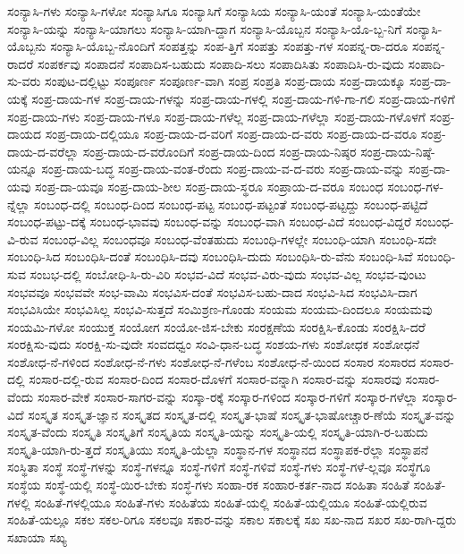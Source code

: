 {ಸಂನ್ಯಾಸಿ-ಗಳು
ಸಂನ್ಯಾಸಿ-ಗಳೋ
ಸಂನ್ಯಾಸಿಗೂ
ಸಂನ್ಯಾಸಿಗೆ
ಸಂನ್ಯಾಸಿಯ
ಸಂನ್ಯಾಸಿ-ಯಂತೆ
ಸಂನ್ಯಾಸಿ-ಯಂತೆಯೇ
ಸಂನ್ಯಾಸಿ-ಯನ್ನು
ಸಂನ್ಯಾಸಿ-ಯಾಗಲು
ಸಂನ್ಯಾಸಿ-ಯಾಗಿ-ದ್ದಾಗ
ಸಂನ್ಯಾಸಿ-ಯೊಬ್ಬನ
ಸಂನ್ಯಾಸಿ-ಯೊ-ಬ್ಬ-ನಿಗೆ
ಸಂನ್ಯಾಸಿ-ಯೊಬ್ಬನು
ಸಂನ್ಯಾಸಿ-ಯೊಬ್ಬ-ನೊಂದಿಗೆ
ಸಂಪತ್ತನ್ನು
ಸಂಪ-ತ್ತಿಗೆ
ಸಂಪತ್ತು
ಸಂಪತ್ತು-ಗಳ
ಸಂಪನ್ನ-ರಾ-ದರೂ
ಸಂಪನ್ನ-ರಾದರೆ
ಸಂಪರ್ಕವು
ಸಂಪಾದನೆ
ಸಂಪಾದಿಸ-ಬಹುದು
ಸಂಪಾದಿ-ಸಲು
ಸಂಪಾದಿಸಿತು
ಸಂಪಾದಿಸಿ-ರು-ವುದು
ಸಂಪಾದಿ-ಸು-ವರು
ಸಂಪುಟ-ದಲ್ಲಿಟ್ಟು
ಸಂಪೂರ್ಣ
ಸಂಪೂರ್ಣ-ವಾಗಿ
ಸಂಪ್ರ
ಸಂಪ್ರತಿ
ಸಂಪ್ರ-ದಾಯ
ಸಂಪ್ರ-ದಾಯಕ್ಕೂ
ಸಂಪ್ರ-ದಾ-ಯಕ್ಕೆ
ಸಂಪ್ರ-ದಾಯ-ಗಳ
ಸಂಪ್ರ-ದಾಯ-ಗಳನ್ನು
ಸಂಪ್ರ-ದಾಯ-ಗಳಲ್ಲಿ
ಸಂಪ್ರ-ದಾಯ-ಗಳಿ-ಗಾ-ಗಲಿ
ಸಂಪ್ರ-ದಾಯ-ಗಳಿಗೆ
ಸಂಪ್ರ-ದಾಯ-ಗಳು
ಸಂಪ್ರ-ದಾಯ-ಗಳೂ
ಸಂಪ್ರ-ದಾಯ-ಗಳೆಲ್ಲ
ಸಂಪ್ರ-ದಾಯ-ಗಳೆಲ್ಲಾ
ಸಂಪ್ರ-ದಾಯ-ಗಳೊಳಗೆ
ಸಂಪ್ರ-ದಾಯದ
ಸಂಪ್ರ-ದಾಯ-ದಲ್ಲಿಯೂ
ಸಂಪ್ರ-ದಾಯ-ದ-ವರಿಗೆ
ಸಂಪ್ರ-ದಾಯ-ದ-ವರು
ಸಂಪ್ರ-ದಾಯ-ದ-ವರೂ
ಸಂಪ್ರ-ದಾಯ-ದ-ವರೆಲ್ಲಾ
ಸಂಪ್ರ-ದಾಯ-ದ-ವರೊಂದಿಗೆ
ಸಂಪ್ರ-ದಾಯ-ದಿಂದ
ಸಂಪ್ರ-ದಾಯ-ನಿಷ್ಠರ
ಸಂಪ್ರ-ದಾಯ-ನಿಷ್ಠೆ-ಯನ್ನೂ
ಸಂಪ್ರ-ದಾಯ-ಬದ್ಧ
ಸಂಪ್ರ-ದಾಯ-ವಂತ-ರೆಂದು
ಸಂಪ್ರ-ದಾಯ-ವ-ದ-ವರು
ಸಂಪ್ರ-ದಾಯ-ವನ್ನು
ಸಂಪ್ರ-ದಾ-ಯವು
ಸಂಪ್ರ-ದಾ-ಯವೂ
ಸಂಪ್ರ-ದಾಯ-ಶೀಲ
ಸಂಪ್ರ-ದಾಯ-ಸ್ಥರೂ
ಸಂಪ್ರಾಯ-ದ-ವರೂ
ಸಂಬಂಧ
ಸಂಬಂಧ-ಗಳ-ನ್ನೆಲ್ಲಾ
ಸಂಬಂಧ-ದಲ್ಲಿ
ಸಂಬಂಧ-ದಿಂದ
ಸಂಬಂಧ-ಪಟ್ಟ
ಸಂಬಂಧ-ಪಟ್ಟಂತೆ
ಸಂಬಂಧ-ಪಟ್ಟದ್ದು
ಸಂಬಂಧ-ಪಟ್ಟಿದೆ
ಸಂಬಂಧ-ಪಟ್ಟು-ದಕ್ಕೆ
ಸಂಬಂಧ-ಭಾವವು
ಸಂಬಂಧ-ವನ್ನು
ಸಂಬಂಧ-ವಾಗಿ
ಸಂಬಂಧ-ವಿದೆ
ಸಂಬಂಧ-ವಿದ್ದರೆ
ಸಂಬಂಧ-ವಿ-ರುವ
ಸಂಬಂಧ-ವಿಲ್ಲ
ಸಂಬಂಧವೂ
ಸಂಬಂಧ-ವೆಂತಹುದು
ಸಂಬಂಧಿ-ಗಳಲ್ಲೇ
ಸಂಬಂಧಿ-ಯಾಗಿ
ಸಂಬಂಧಿ-ಸದೇ
ಸಂಬಂಧಿ-ಸಿದ
ಸಂಬಂಧಿಸಿ-ದಂತೆ
ಸಂಬಂಧಿಸಿ-ದವು
ಸಂಬಂಧಿಸಿ-ದುದು
ಸಂಬಂಧಿಸಿ-ರು-ವೆನು
ಸಂಬಂಧಿ-ಸಿವೆ
ಸಂಬಂಧಿ-ಸುವ
ಸಂಬಭ-ದಲ್ಲಿ
ಸಂಬೋಧಿ-ಸಿ-ರು-ವಿರಿ
ಸಂಭವ-ವಿದೆ
ಸಂಭವ-ವಿರು-ವುದು
ಸಂಭವ-ವಿಲ್ಲ
ಸಂಭವ-ವುಂಟು
ಸಂಭವವೂ
ಸಂಭವವೇ
ಸಂಭ-ವಾಮಿ
ಸಂಭವಿಸ-ದಂತೆ
ಸಂಭವಿಸ-ಬಹು-ದಾದ
ಸಂಭವಿ-ಸಿದ
ಸಂಭವಿಸಿ-ದಾಗ
ಸಂಭವಿಸಿಯೇ
ಸಂಭವಿಸಿಲ್ಲ
ಸಂಭವಿ-ಸುತ್ತದೆ
ಸಂಮಿಶ್ರಣ-ಗೊಂಡು
ಸಂಯಮ
ಸಂಯಮ-ದಿಂದಲೂ
ಸಂಯಮವು
ಸಂಯಮಿ-ಗಳೋ
ಸಂಯುಕ್ತ
ಸಂಯೋಗ
ಸಂಯೋ-ಜಿಸ-ಬೇಕು
ಸಂರಕ್ಷಣೆಯ
ಸಂರಕ್ಷಿಸಿ-ಕೊಂಡು
ಸಂರಕ್ಷಿಸಿ-ದರೆ
ಸಂರಕ್ಷಿಸು-ವುದು
ಸಂರಕ್ಷಿ-ಸು-ವುದೇ
ಸಂವದಧ್ವಂ
ಸಂವಿ-ಧಾನ-ಬದ್ಧ
ಸಂಶಯ-ಗಳು
ಸಂಶೋಧಕ
ಸಂಶೋಧನೆ
ಸಂಶೋಧ-ನೆ-ಗಳಿಂದ
ಸಂಶೋಧ-ನೆ-ಗಳು
ಸಂಶೋಧ-ನೆ-ಗಳೆಂಬ
ಸಂಶೋಧ-ನೆ-ಯಿಂದ
ಸಂಸಾರ
ಸಂಸಾರದ
ಸಂಸಾರ-ದಲ್ಲಿ
ಸಂಸಾರ-ದಲ್ಲಿ-ರುವ
ಸಂಸಾರ-ದಿಂದ
ಸಂಸಾರ-ದೊಳಗೆ
ಸಂಸಾರ-ವನ್ನಾಗಿ
ಸಂಸಾರ-ವನ್ನು
ಸಂಸಾರವು
ಸಂಸಾರ-ವೆಂದು
ಸಂಸಾರ-ವೇಕೆ
ಸಂಸಾರ-ಸಾಗರ-ವನ್ನು
ಸಂಸ್ಕಾ-ರಕ್ಕೆ
ಸಂಸ್ಕಾರ-ಗಳಿಂದ
ಸಂಸ್ಕಾರ-ಗಳಿಗೆ
ಸಂಸ್ಕಾರ-ಗಳೆಲ್ಲಾ
ಸಂಸ್ಕಾರ-ವಿದೆ
ಸಂಸ್ಕೃತ
ಸಂಸ್ಕೃತ-ಜ್ಞಾನ
ಸಂಸ್ಕೃತದ
ಸಂಸ್ಕೃತ-ದಲ್ಲಿ
ಸಂಸ್ಕೃತ-ಭಾಷೆ
ಸಂಸ್ಕೃತ-ಭಾಷೋಚ್ಚಾರ-ಣೆಯೆ
ಸಂಸ್ಕೃತ-ವನ್ನು
ಸಂಸ್ಕೃತ-ವೆಂದು
ಸಂಸ್ಕೃತಿ
ಸಂಸ್ಕೃತಿಗೆ
ಸಂಸ್ಕೃತಿಯ
ಸಂಸ್ಕೃತಿ-ಯನ್ನು
ಸಂಸ್ಕೃತಿ-ಯಲ್ಲಿ
ಸಂಸ್ಕೃತಿ-ಯಾಗಿ-ರ-ಬಹುದು
ಸಂಸ್ಕೃತಿ-ಯಾಗಿ-ರು-ತ್ತದೆ
ಸಂಸ್ಕೃತಿಯು
ಸಂಸ್ಕೃತಿ-ಯೆಲ್ಲಾ
ಸಂಸ್ಥಾನ-ಗಳ
ಸಂಸ್ಥಾನದ
ಸಂಸ್ಥಾಪಕ-ರೆಲ್ಲಾ
ಸಂಸ್ಥಾಪನೆ
ಸಂಸ್ಥಿತಾ
ಸಂಸ್ಥೆ
ಸಂಸ್ಥೆ-ಗಳನ್ನು
ಸಂಸ್ಥೆ-ಗಳನ್ನೂ
ಸಂಸ್ಥೆ-ಗಳಿಗೆ
ಸಂಸ್ಥೆ-ಗಳಿವೆ
ಸಂಸ್ಥೆ-ಗಳು
ಸಂಸ್ಥೆ-ಗಳೆ-ಲ್ಲವೂ
ಸಂಸ್ಥೆಗೂ
ಸಂಸ್ಥೆಯ
ಸಂಸ್ಥೆ-ಯಲ್ಲಿ
ಸಂಸ್ಥೆ-ಯಿರ-ಬೇಕು
ಸಂಸ್ಧೆ-ಗಳು
ಸಂಹಾ-ರಕ
ಸಂಹಾರ-ಕರ್ತ-ನಾದ
ಸಂಹಿತಾ
ಸಂಹಿತೆ
ಸಂಹಿತೆ-ಗಳಲ್ಲಿ
ಸಂಹಿತೆ-ಗಳಲ್ಲಿಯೂ
ಸಂಹಿತೆ-ಗಳು
ಸಂಹಿತೆಯ
ಸಂಹಿತೆ-ಯಲ್ಲಿ
ಸಂಹಿತೆ-ಯಲ್ಲಿಯೂ
ಸಂಹಿತೆ-ಯಲ್ಲಿರುವ
ಸಂಹಿತೆ-ಯಲ್ಲೂ
ಸಕಲ
ಸಕಲ-ರಿಗೂ
ಸಕಲವೂ
ಸಕಾರ-ವನ್ನು
ಸಕಾಲ
ಸಕಾಲಕ್ಕೆ
ಸಖ
ಸಖ-ನಾದ
ಸಖರ
ಸಖ-ರಾಗಿ-ದ್ದರು
ಸಖಾಯಾ
ಸಖ್ಯ
}
